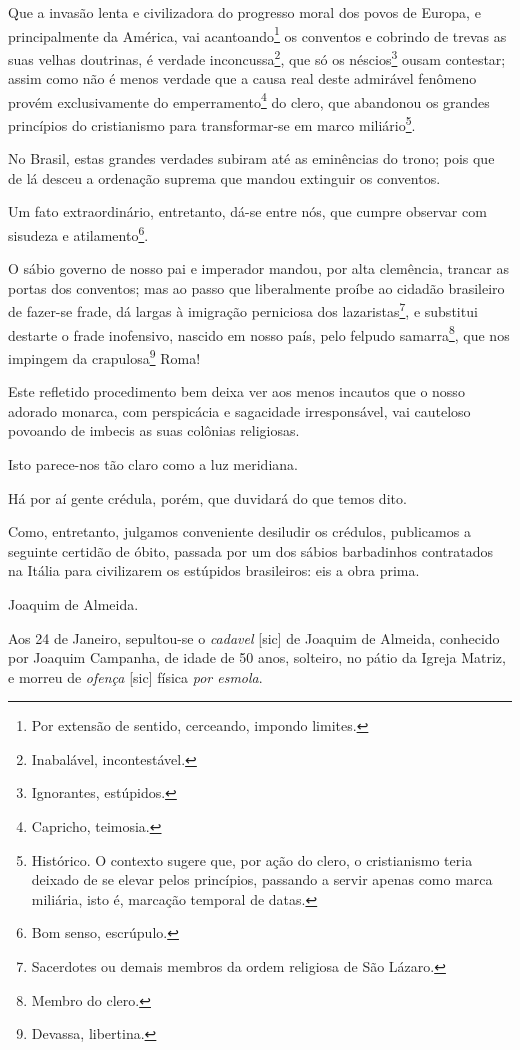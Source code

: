 \asterisc{}

Que a invasão lenta e civilizadora do progresso moral dos povos de
Europa, e principalmente da América, vai acantoando\footnote{Por
  extensão de sentido, cerceando, impondo limites.} os conventos e
cobrindo de trevas as suas velhas doutrinas, é verdade
inconcussa\footnote{Inabalável, incontestável.}, que só os
néscios\footnote{Ignorantes, estúpidos.} ousam contestar; assim como
não é menos verdade que a causa real deste admirável fenômeno provém
exclusivamente do emperramento\footnote{Capricho, teimosia.} do clero,
que abandonou os grandes princípios do cristianismo para transformar-se
em marco miliário\footnote{Histórico. O contexto sugere que, por ação
  do clero, o cristianismo teria deixado de se elevar pelos princípios,
  passando a servir apenas como marca miliária, isto é, marcação
  temporal de datas.}.

No Brasil, estas grandes verdades subiram até as eminências do trono;
pois que de lá desceu a ordenação suprema que mandou extinguir os
conventos.

Um fato extraordinário, entretanto, dá-se entre nós, que cumpre observar
com sisudeza e atilamento\footnote{Bom senso, escrúpulo.}.

O sábio governo de nosso pai e imperador mandou, por alta clemência,
trancar as portas dos conventos; mas ao passo que liberalmente proíbe ao
cidadão brasileiro de fazer-se frade, dá largas à imigração perniciosa
dos lazaristas\footnote{Sacerdotes ou demais membros da ordem
  religiosa de São Lázaro.}, e substitui destarte o frade inofensivo,
nascido em nosso país, pelo felpudo samarra\footnote{Membro do clero.},
que nos impingem da crapulosa\footnote{Devassa, libertina.} Roma!

Este refletido procedimento bem deixa ver aos menos incautos que o nosso
adorado monarca, com perspicácia e sagacidade irresponsável, vai
cauteloso povoando de imbecis as suas colônias religiosas.

Isto parece-nos tão claro como a luz meridiana.

Há por aí gente crédula, porém, que duvidará do que temos dito.

Como, entretanto, julgamos conveniente desiludir os crédulos, publicamos
a seguinte certidão de óbito, passada por um dos sábios barbadinhos
contratados na Itália para civilizarem os estúpidos brasileiros: eis a
obra prima.

Joaquim de Almeida.

Aos 24 de Janeiro, sepultou-se o \emph{cadavel} {[}sic{]} de Joaquim de
Almeida, conhecido por Joaquim Campanha, de idade de 50 anos, solteiro,
no pátio da Igreja Matriz, e morreu de \emph{ofença} {[}sic{]} física
\emph{por esmola}.

